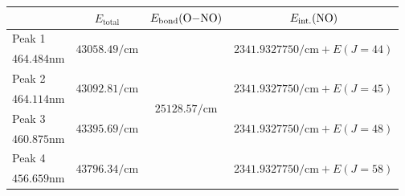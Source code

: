 \documentclass[aspectratio=43,scheme=plain]{ctexbeamer}
\begin{document}
	\begin{frame}{\insertsubsection}{\insertsubsubsection}
		\begin{table}[htbp]
			\centering
			\tiny
			\begin{tabularx}{0.9\textwidth}{lccc}
				\toprule
				& $E_\text{total}$ & $E_\text{bond}(\ce{O-NO})$\footfullcite{ono} & $E_\text{int.}(\ce{NO})$ \\
				\midrule
				Peak 1 & \multirow{2}[2]{*}{$\num{43058.49}\unit{\per \centi \meter}$} & \multirow{8}[8]{*}{$\num{25128.57}\unit{\per \centi \meter}$} & \multirow{2}[2]{*}{$\num{2341.9327750}\unit{\per \centi \meter}+ E( J = 44 )$} \\
				$\num{464.484}\unit{\nano\meter}$ & & & \\
				\cmidrule{1-2}\cmidrule{4-4}
				Peak 2 & \multirow{2}[2]{*}{$\num{43092.81}\unit{\per \centi \meter}$} & & \multirow{2}[2]{*}{$\num{2341.9327750}\unit{\per \centi \meter}+ E( J = 45 )$} \\
				$\num{464.114}\unit{\nano\meter}$ & & & \\
				\cmidrule{1-2}\cmidrule{4-4}
				Peak 3 & \multirow{2}[2]{*}{$\num{43395.69}\unit{\per \centi \meter}$} & & \multirow{2}[2]{*}{$\num{2341.9327750}\unit{\per \centi \meter}+ E( J = 48 )$} \\
				$\num{460.875}\unit{\nano\meter}$ & & & \\
				\cmidrule{1-2}\cmidrule{4-4}
				Peak 4 & \multirow{2}[2]{*}{$\num{43796.34}\unit{\per \centi \meter}$} & & \multirow{2}[2]{*}{$\num{2341.9327750}\unit{\per \centi \meter}+ E( J = 58 )$} \\
				$\num{456.659}\unit{\nano\meter}$ & & & \\
				\bottomrule
			\end{tabularx}
		\end{table}
	\end{frame}	
\end{document}
